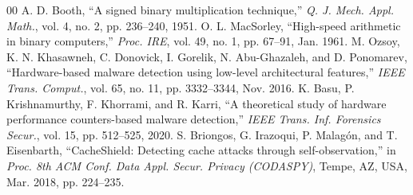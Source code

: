 \documentclass[journal,twocolumn,10pt]{IEEEtran}
\begin{document}
\begin{thebibliography}{00}
 A. D. Booth, ``A signed binary multiplication technique,'' \textit{Q. J. Mech. Appl. Math.}, vol. 4, no. 2, pp. 236--240, 1951.
 O. L. MacSorley, ``High-speed arithmetic in binary computers,'' \textit{Proc. IRE}, vol. 49, no. 1, pp. 67--91, Jan. 1961.
 M. Ozsoy, K. N. Khasawneh, C. Donovick, I. Gorelik, N. Abu-Ghazaleh, and D. Ponomarev, ``Hardware-based malware detection using low-level architectural features,'' \textit{IEEE Trans. Comput.}, vol. 65, no. 11, pp. 3332--3344, Nov. 2016.
 K. Basu, P. Krishnamurthy, F. Khorrami, and R. Karri, ``A theoretical study of hardware performance counters-based malware detection,'' \textit{IEEE Trans. Inf. Forensics Secur.}, vol. 15, pp. 512--525, 2020.
 S. Briongos, G. Irazoqui, P. Malag\'on, and T. Eisenbarth, ``CacheShield: Detecting cache attacks through self-observation,'' in \textit{Proc. 8th ACM Conf. Data Appl. Secur. Privacy (CODASPY)}, Tempe, AZ, USA, Mar. 2018, pp. 224--235.
\end{thebibliography}
\end{document}
